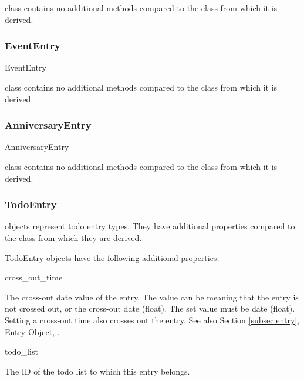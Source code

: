  class contains no additional methods compared to 
the  class from which it is derived.

\subsubsection{EventEntry}
\label{subsubsec:evententry}

\begin{classdesc*}{EventEntry}
\end{classdesc*}

 class contains no additional methods compared to the 
 class from which it is derived.

\subsubsection{AnniversaryEntry}
\label{subsubsec:anniversaryentry}

\begin{classdesc*}{AnniversaryEntry}
\end{classdesc*}

 class contains no additional methods compared to 
the  class from which it is derived.

\subsubsection{TodoEntry}
\label{subsubsec:todoentry}

objects represent todo entry types. They have additional 
properties compared to the  class from which they are derived.

\begin{classdesc*}{TodoEntry}
objects have the following additional properties:

\begin{memberdesc}[TodoEntry]{cross_out_time}

The cross-out date value of the entry. The value can be  meaning that 
the entry is not crossed out, or the cross-out date (float). The set value must 
be date (float). Setting a cross-out time also crosses out the entry. See also 
Section \ref{subsec:entry}, Entry Object, .

\end{memberdesc}

\begin{memberdesc}[TodoEntry]{todo_list}

The ID of the todo list to which this entry belongs.

\end{memberdesc}

\end{classdesc*}

